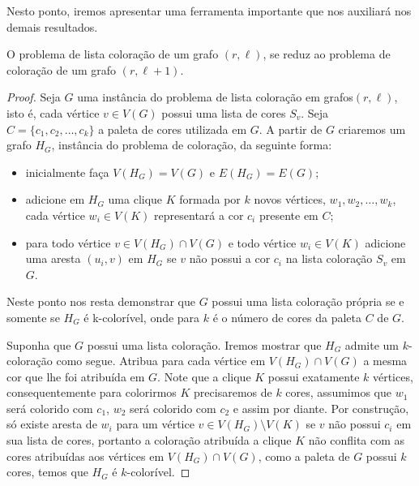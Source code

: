 Nesto ponto, iremos apresentar uma ferramenta importante que nos auxiliará nos demais resultados.

\begin{teorema}
\label{theorem:list-coloring}
O problema de lista coloração de um grafo $(r,\ell)$, se reduz ao problema de coloração de um grafo $(r,\ell+1)$.
\end{teorema}

\begin{proof}
Seja $G$ uma instância do problema de lista coloração em grafos$(r,\ell)$, isto é, cada vértice $v \in V(G)$ possui uma lista de cores $S_v$. Seja $C=\{c_1,c_2,\ldots,c_k\}$ a paleta de cores utilizada em $G$. A  partir de $G$ criaremos um grafo $H_G$, instância do problema de coloração, da seguinte forma:

\begin{itemize}
\item inicialmente faça $V(H_G)=V(G)$ e $E(H_G)=E(G)$;
\item adicione em $H_G$ uma clique $K$ formada por $k$ novos vértices, $w_1,w_2,\ldots,w_k$, cada vértice $w_i \in V(K)$ representará a cor $c_i$ presente em $C$;
\item para todo vértice $v \in V(H_G)\cap V(G)$ e todo vértice $w_i \in V(K)$ adicione uma aresta $(u_i,v)$ em $H_G$ se $v$ não possui a cor $c_i$ na lista coloração $S_v$ em $G$.
\end{itemize}

Neste ponto nos resta demonstrar que $G$ possui uma lista coloração própria se e somente se $H_G$ é k-colorível, onde para $k$ é o número de cores da paleta $C$ de $G$.


Suponha que $G$ possui uma lista coloração. Iremos mostrar que $H_G$ admite um $k$-coloração como segue. Atribua para cada vértice em $V(H_G)\cap V(G)$ a mesma cor que lhe foi atribuída em $G$. Note que a clique $K$ possui exatamente $k$ vértices, consequentemente para colorirmos $K$ precisaremos de $k$ cores, assumimos que $w_1$ será colorido com $c_1$, $w_2$ será colorido com $c_2$ e assim por diante. Por construção, só existe aresta de $w_i$ para um vértice $v \in V(H_G)\setminus V(K)$ se $v$ não possui $c_i$ em sua lista de cores, portanto a coloração atribuída a clique $K$ não conflita com as cores atribuídas aos vértices em $V(H_G)\cap V(G)$, como a paleta de $G$ possui $k$ cores, temos que $H_G$ é $k$-colorível.



\end{proof}
